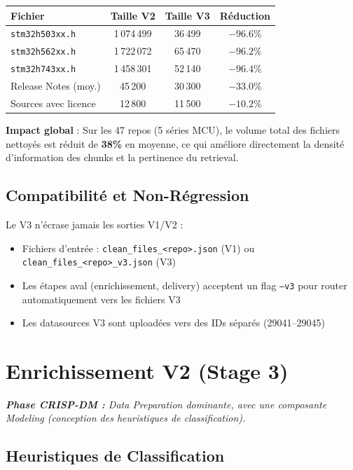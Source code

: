 \documentclass[12pt,a4paper]{report}
\begin{document}
\begin{longtable}{p{5cm}ccc}
\toprule
\textbf{Fichier} & \textbf{Taille V2} & \textbf{Taille V3} & \textbf{Réduction} \\
\midrule
\texttt{stm32h503xx.h} & 1\,074\,499 & 36\,499 & $-96.6\%$ \\
\texttt{stm32h562xx.h} & 1\,722\,072 & 65\,470 & $-96.2\%$ \\
\texttt{stm32h743xx.h} & 1\,458\,301 & 52\,140 & $-96.4\%$ \\
Release Notes (moy.) & 45\,200 & 30\,300 & $-33.0\%$ \\
Sources avec licence & 12\,800 & 11\,500 & $-10.2\%$ \\
\bottomrule
\end{longtable}

\textbf{Impact global} : Sur les 47 repos (5 séries MCU), le volume total des fichiers nettoyés est réduit de \textbf{38\%} en moyenne, ce qui améliore directement la densité d'information des chunks et la pertinence du retrieval.

\subsection{Compatibilité et Non-Régression}

Le V3 n'écrase jamais les sorties V1/V2 :
\begin{itemize}
  \item Fichiers d'entrée : \texttt{clean\_files\_<repo>.json} (V1) ou \texttt{clean\_files\_<repo>\_v3.json} (V3)
  \item Les étapes aval (enrichissement, delivery) acceptent un flag \texttt{--v3} pour router automatiquement vers les fichiers V3
  \item Les datasources V3 sont uploadées vers des IDs séparés (29041--29045)
\end{itemize}

\section{Enrichissement V2 (Stage 3)}

\textit{\small\textbf{\textcolor{stblue}{Phase CRISP-DM :}} Data Preparation dominante, avec une composante Modeling (conception des heuristiques de classification).}\par\smallskip

\subsection{Heuristiques de Classification}
\end{document}
